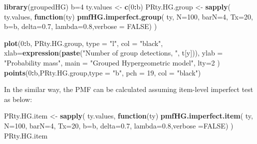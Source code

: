 \documentclass[
]{article}
\newenvironment{Shaded}{\begin{snugshade}}{\end{snugshade}}
\newcommand{\AttributeTok}[1]{\textcolor[rgb]{0.13,0.29,0.53}{#1}}
\newcommand{\ConstantTok}[1]{\textcolor[rgb]{0.56,0.35,0.01}{#1}}
\newcommand{\ControlFlowTok}[1]{\textcolor[rgb]{0.13,0.29,0.53}{\textbf{#1}}}
\newcommand{\DecValTok}[1]{\textcolor[rgb]{0.00,0.00,0.81}{#1}}
\newcommand{\FloatTok}[1]{\textcolor[rgb]{0.00,0.00,0.81}{#1}}
\newcommand{\FunctionTok}[1]{\textcolor[rgb]{0.13,0.29,0.53}{\textbf{#1}}}
\newcommand{\NormalTok}[1]{#1}
\newcommand{\OtherTok}[1]{\textcolor[rgb]{0.56,0.35,0.01}{#1}}
\newcommand{\SpecialCharTok}[1]{\textcolor[rgb]{0.81,0.36,0.00}{\textbf{#1}}}
\newcommand{\StringTok}[1]{\textcolor[rgb]{0.31,0.60,0.02}{#1}}
\begin{document}
\begin{Shaded}
\begin{Highlighting}[]
\FunctionTok{library}\NormalTok{(groupedHG)}
\NormalTok{b}\OtherTok{=}\DecValTok{4}
\NormalTok{ty.values }\OtherTok{\textless{}{-}} \FunctionTok{c}\NormalTok{(}\DecValTok{0}\SpecialCharTok{:}\NormalTok{b)}
\NormalTok{PRty.HG.group }\OtherTok{\textless{}{-}} \FunctionTok{sapply}\NormalTok{(}
\NormalTok{ty.values,}
\ControlFlowTok{function}\NormalTok{(ty) }\FunctionTok{pmfHG.imperfect.group}\NormalTok{(}
\NormalTok{ty, }\AttributeTok{N=}\DecValTok{100}\NormalTok{, }\AttributeTok{barN=}\DecValTok{4}\NormalTok{, }\AttributeTok{Tx=}\DecValTok{20}\NormalTok{, }\AttributeTok{b=}\NormalTok{b, }
\AttributeTok{delta=}\FloatTok{0.7}\NormalTok{, }\AttributeTok{lambda=}\FloatTok{0.8}\NormalTok{,}\AttributeTok{verbose =} \ConstantTok{FALSE}\NormalTok{)}
\NormalTok{)}

\FunctionTok{plot}\NormalTok{(}\DecValTok{0}\SpecialCharTok{:}\NormalTok{b, PRty.HG.group, }
  \AttributeTok{type =} \StringTok{"l"}\NormalTok{, }\AttributeTok{col =} \StringTok{"black"}\NormalTok{, }
  \AttributeTok{xlab=}\FunctionTok{expression}\NormalTok{(}\FunctionTok{paste}\NormalTok{(}\StringTok{"Number of group detections, "}\NormalTok{, t[y])),}
     \AttributeTok{ylab =} \StringTok{"Probability mass"}\NormalTok{, }
     \AttributeTok{main =} \StringTok{"Grouped Hypergeometric model"}\NormalTok{,}
     \AttributeTok{lty=}\DecValTok{2}
\NormalTok{)}
\FunctionTok{points}\NormalTok{(}\DecValTok{0}\SpecialCharTok{:}\NormalTok{b,PRty.HG.group,}\AttributeTok{type =} \StringTok{"b"}\NormalTok{, }\AttributeTok{pch =} \DecValTok{19}\NormalTok{, }\AttributeTok{col =} \StringTok{"black"}\NormalTok{)}
\end{Highlighting}
\end{Shaded}

In the similar way, the PMF can be calculated assuming item-level
imperfect test as below:

\begin{Shaded}
\begin{Highlighting}[]
\NormalTok{PRty.HG.item }\OtherTok{\textless{}{-}} \FunctionTok{sapply}\NormalTok{(}
\NormalTok{ty.values, }
\ControlFlowTok{function}\NormalTok{(ty) }\FunctionTok{pmfHG.imperfect.item}\NormalTok{(}
\NormalTok{ty, }\AttributeTok{N=}\DecValTok{100}\NormalTok{, }\AttributeTok{barN=}\DecValTok{4}\NormalTok{, }\AttributeTok{Tx=}\DecValTok{20}\NormalTok{, }\AttributeTok{b=}\NormalTok{b, }
\AttributeTok{delta=}\FloatTok{0.7}\NormalTok{, }\AttributeTok{lambda=}\FloatTok{0.8}\NormalTok{,}\AttributeTok{verbose =}\ConstantTok{FALSE}\NormalTok{)}
\NormalTok{)}
\NormalTok{PRty.HG.item}
\end{Highlighting}
\end{Shaded}
\end{document}

